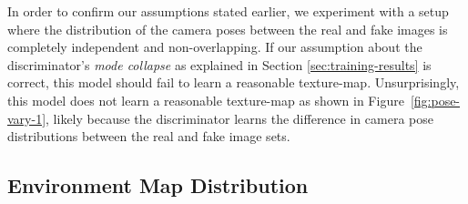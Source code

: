 In order to confirm our assumptions stated earlier, we experiment with a setup where the
distribution of the camera poses between the real and fake images is completely independent and
non-overlapping. If our assumption about the discriminator's \emph{mode collapse} as explained in
Section \ref{sec:training-results} is correct, this model should fail to learn a reasonable
texture-map. Unsurprisingly, this model does not learn a reasonable texture-map as shown in
Figure~\ref{fig:pose-vary-1}, likely because the discriminator learns the difference in camera
pose distributions between the real and fake image sets.

\subsection{Environment Map Distribution}

